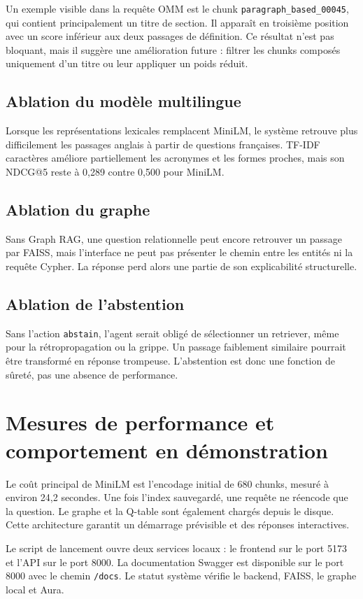 \documentclass[12pt,a4paper,oneside]{report}
\newcommand{\tech}[1]{\texttt{#1}}
\begin{document}
Un exemple visible dans la requête OMM est le chunk \tech{paragraph\_based\_00045}, qui contient principalement un titre de section. Il apparaît en troisième position avec un score inférieur aux deux passages de définition. Ce résultat n'est pas bloquant, mais il suggère une amélioration future : filtrer les chunks composés uniquement d'un titre ou leur appliquer un poids réduit.

\subsection{Ablation du modèle multilingue}
Lorsque les représentations lexicales remplacent MiniLM, le système retrouve plus difficilement les passages anglais à partir de questions françaises. TF-IDF caractères améliore partiellement les acronymes et les formes proches, mais son NDCG@5 reste à 0,289 contre 0,500 pour MiniLM.

\subsection{Ablation du graphe}
Sans Graph RAG, une question relationnelle peut encore retrouver un passage par FAISS, mais l'interface ne peut pas présenter le chemin entre les entités ni la requête Cypher. La réponse perd alors une partie de son explicabilité structurelle.

\subsection{Ablation de l'abstention}
Sans l'action \tech{abstain}, l'agent serait obligé de sélectionner un retriever, même pour la rétropropagation ou la grippe. Un passage faiblement similaire pourrait être transformé en réponse trompeuse. L'abstention est donc une fonction de sûreté, pas une absence de performance.

\section{Mesures de performance et comportement en démonstration}
Le coût principal de MiniLM est l'encodage initial de 680 chunks, mesuré à environ 24,2 secondes. Une fois l'index sauvegardé, une requête ne réencode que la question. Le graphe et la Q-table sont également chargés depuis le disque. Cette architecture garantit un démarrage prévisible et des réponses interactives.

Le script de lancement ouvre deux services locaux : le frontend sur le port 5173 et l'API sur le port 8000. La documentation Swagger est disponible sur le port 8000 avec le chemin \tech{/docs}. Le statut système vérifie le backend, FAISS, le graphe local et Aura.
\end{document}
